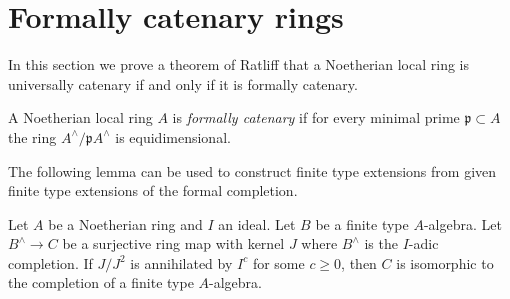 \section{Formally catenary rings}
\label{section-formally-catenary}

\noindent
In this section we prove a theorem of Ratliff
\cite{Ratliff} that a Noetherian local
ring is universally catenary if and only if it is formally catenary.

\begin{definition}
\label{definition-formally-catenary}
A Noetherian local ring $A$ is {\it formally catenary}
if for every minimal prime $\mathfrak p \subset A$ the ring
$A^\wedge/\mathfrak p A^\wedge$ is equidimensional.
\end{definition}

\noindent
The following lemma can be used to construct finite type extensions
from given finite type extensions of the formal completion.

\begin{lemma}
\label{lemma-quotient-by-idempotent}
Let $A$ be a Noetherian ring and $I$ an ideal. Let $B$
be a finite type $A$-algebra. Let $B^\wedge \to C$ be a surjective
ring map with kernel $J$ where $B^\wedge$ is the $I$-adic completion.
If $J/J^2$ is annihilated by $I^c$ for some $c \geq 0$, then $C$ is
isomorphic to the completion of a finite type $A$-algebra.
\end{lemma}

